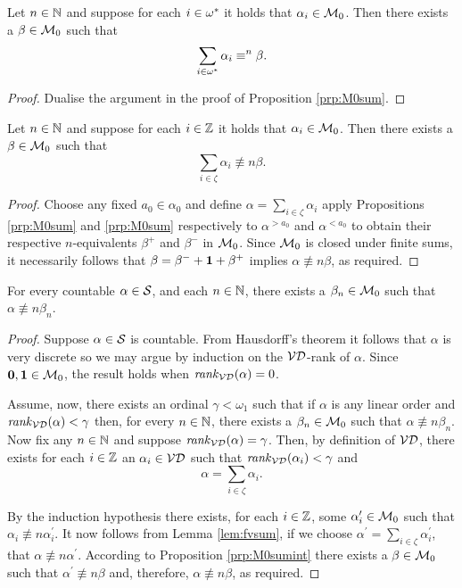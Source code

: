 \begin{prp}\label{prp:M0sumop}
	Let $n\in\mathbb{N}$ and suppose for each $i\in{\omega}^\ast$ it holds that
	$\alpha_i\in\mathcal{M}_0$.  Then there exists a $\beta\in\mathcal{M}_0$ such that
	\begin{equation}
		\sum_{i\in{\omega}^\ast}\alpha_i\equiv^{n}\beta.
	\end{equation}
\end{prp}
\begin{proof}
	Dualise the argument in the proof of Proposition \ref{prp:M0sum}.
\end{proof}

\begin{prp}\label{prp:M0sumint}
	Let $n\in\mathbb{N}$ and suppose for each $i\in\mathbb{Z}$ it holds that
	$\alpha_i\in\mathcal{M}_0$.  Then there exists a $\beta\in\mathcal{M}_0$ such that
	\begin{equation}
		\sum_{i\in\zeta}\alpha_i\nequiv{n}\beta.
	\end{equation}
\end{prp}
\begin{proof}
	Choose any fixed $a_0\in\alpha_0$ and define
	$\alpha=\sum_{i\in\zeta}\alpha_i$ apply Propositions \ref{prp:M0sum} and
	\ref{prp:M0sum} respectively to $\alpha^{>a_0}$ and $\alpha^{<a_0}$ to
	obtain their respective $n$-equivalents $\beta^+$ and $\beta^-$ in $\mathcal{M}_0$.
	Since $\mathcal{M}_0$ is closed under finite sums, it necessarily follows that
	$\beta=\beta^-+\mathbf{1}+\beta^+$ implies $\alpha\nequiv{n}\beta$, as required.
\end{proof}

\begin{thm}
	For every countable $\alpha\in\mathcal{S}$, and each $n\in\mathbb{N}$, there
	exists a $\beta_n\in\mathcal{M}_0$ such that $\alpha\nequiv{n}\beta_n$.
\end{thm}
\begin{proof}
	Suppose $\alpha\in\mathcal{S}$ is countable.  From Hausdorff's theorem it
	follows that $\alpha$ is very discrete so we may argue by induction on the
	$\mathcal{VD}$-rank of $\alpha$. Since $\mathbf{0},\mathbf{1}\in\mathcal{M}_0$, the result holds when
	$\mathit{rank}_\mathcal{VD}(\alpha)=0$.

	Assume, now, there exists an ordinal $\gamma<\omega_1$ such that if $\alpha$
	is any linear order and $\mathit{rank}_\mathcal{VD}(\alpha)<\gamma$ then, for every
	$n\in\mathbb{N}$, there exists a $\beta_n\in\mathcal{M}_0$ such that
	$\alpha\nequiv{n}\beta_n$.  Now fix any $n\in\mathbb{N}$ and  suppose
	$\mathit{rank}_\mathcal{VD}(\alpha)=\gamma$.  Then, by definition of $\mathcal{VD}$, there exists for
	each $i\in\mathbb{Z}$ an $\alpha_i\in\mathcal{VD}$ such that $\mathit{rank}_\mathcal{VD}(\alpha_i)<\gamma$
	and
	\begin{equation}
		\alpha=\sum_{i\in\zeta}\alpha_i.
	\end{equation}

	By the induction hypothesis there exists, for each $i\in\mathbb{Z}$, some
	$\alpha^\prime_i\in\mathcal{M}_0$ such that $\alpha_i\nequiv{n}\alpha_i^\prime$.
	It now follows from Lemma \ref{lem:fvsum}, if we choose
	$\alpha^\prime=\sum_{i\in\zeta}\alpha_i^\prime$, that
	$\alpha\nequiv{n}\alpha^\prime$.  According to Proposition
	\ref{prp:M0sumint} there exists a $\beta\in\mathcal{M}_0$ such that
	$\alpha^\prime\nequiv{n}\beta$ and, therefore, $\alpha\nequiv{n}\beta$, as
	required.
\end{proof}

